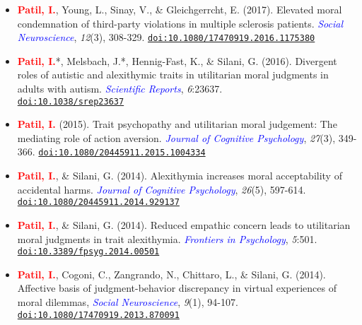 \documentclass[10pt]{article}
\begin{document}
\begin{itemize}
	\item \textbf{\textcolor{red}{Patil, I.}}, Young, L., Sinay, V., \& Gleichgerrcht, E. (2017). Elevated moral condemnation of third-party violations in multiple sclerosis patients. \textit{\textcolor{blue}{Social Neuroscience}}, \textit{12}(3), 308-329. \href{https://drive.google.com/open?id=0B6_u70YpdJKnT3M0bWpPdDY4RHc}{\tt doi:10.1080/17470919.2016.1175380}
	
	\item \textbf{\textcolor{red}{Patil, I.}}*, Melsbach, J.*, Hennig-Fast, K., \& Silani, G. (2016). Divergent roles of autistic and alexithymic traits in utilitarian moral judgments in adults with autism. \textit{\textcolor{blue}{Scientific Reports}}, \textit{6}:23637.\\
	\href{https://drive.google.com/file/d/0B6_u70YpdJKnV1p2UmNwa09iS1k/view?usp=sharing}{\tt doi:10.1038/srep23637}
	
	\item \textbf{\textcolor{red}{Patil, I.}} (2015). Trait psychopathy and utilitarian moral judgement: The mediating role of action aversion. \textit{\textcolor{blue}{Journal of Cognitive Psychology}}, \textit{27}(3), 349-366. \href{https://drive.google.com/file/d/0B6_u70YpdJKnQjVJUFgtR2ZmWTVqZGxRMEFfemVIOUVuME5Z/view?usp=sharing}{\tt doi:10.1080/20445911.2015.1004334}
	
	\item \textbf{\textcolor{red}{Patil, I.}}, \& Silani, G. (2014). Alexithymia increases moral acceptability of accidental harms. \textit{\textcolor{blue}{Journal of Cognitive Psychology}}, \textit{26}(5), 597-614. \href{https://drive.google.com/file/d/0B6_u70YpdJKnMU5pVHRUM3p0SFk/view?usp=sharing}{\tt doi:10.1080/20445911.2014.929137}
	
	\item \textbf{\textcolor{red}{Patil, I.}}, \& Silani, G. (2014). Reduced empathic concern leads to utilitarian moral judgments in trait alexithymia. \textit{\textcolor{blue}{Frontiers in Psychology}}, \textit{5}:501. \href{https://drive.google.com/file/d/0B6_u70YpdJKnUkJZR252dXBwcVk/view?usp=sharing}{\tt doi:10.3389/fpsyg.2014.00501}
	
	\item \textbf{\textcolor{red}{Patil, I.}}, Cogoni, C., Zangrando, N., Chittaro, L., \& Silani, G. (2014). {Affective basis of judgment-behavior discrepancy in virtual experiences of moral dilemmas}, \textit{\textcolor{blue}{Social Neuroscience}}, \textit{9}(1), 94-107. \\
	\href{https://drive.google.com/file/d/0B6_u70YpdJKnV3RIR2s2cWlFdVU/view?usp=sharing}{\tt doi:10.1080/17470919.2013.870091}
	
	\end{itemize}
	
\end{document}
